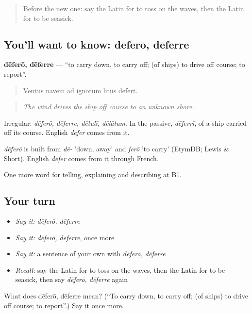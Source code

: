 \begin{quote}
Before the new one: say the Latin for to toss on the waves, then the Latin for to be seasick.
\end{quote}

\subsection*{You'll want to know: dēferō, dēferre}
\textbf{dēferō, dēferre} — \textquotedblleft{}to carry down, to carry off; (of ships) to drive off course; to report\textquotedblright{}.

\begin{quote}
Ventus nāvem ad ignōtum lītus dēfert.
\end{quote}

\begin{quote}
\emph{The wind drives the ship off course to an unknown shore.}
\end{quote}

Irregular: \emph{dēferō, dēferre, dētulī, dēlātum}. In the passive, \emph{dēferrī}, of a ship carried off its course. English \emph{defer} comes from it.

\begin{cousinweb}
\emph{dēferō} is built from \emph{dē-} 'down, away' and \emph{ferō} 'to carry' (EtymDB; Lewis \& Short). English \emph{defer} comes from it through French.
\end{cousinweb}

\begin{grammarlens}[title={What you've built}]
One more word for telling, explaining and describing at B1.
\end{grammarlens}

\subsection*{Your turn}
\begin{itemize}
\raggedright
  \item \emph{Say it:} \emph{dēferō, dēferre}
  \item \emph{Say it:} \emph{dēferō, dēferre}, once more
  \item \emph{Say it:} a sentence of your own with \emph{dēferō, dēferre}
  \item \emph{Recall:} say the Latin for to toss on the waves, then the Latin for to be seasick, then say \emph{dēferō, dēferre} again
\end{itemize}

\begin{tcolorbox}[breakable,colback=teal!4,colframe=teal!35!black,title={Before you move on}]
What does dēferō, dēferre mean? (\textquotedblleft{}To carry down, to carry off; (of ships) to drive off course; to report\textquotedblright{}.) Say it once more.
\end{tcolorbox}
